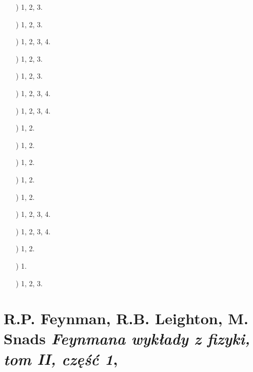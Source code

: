 \documentclass[a4paper,11pt]{article}
\numberwithin{equation}{section}
\begin{document}
\begin{itemize}

\item[\romannumeral3)] 1, 2, 3.

\item[\romannumeral4)] 1, 2, 3.

\item[\romannumeral5)] 1, 2, 3, 4.

\item[\romannumeral6)] 1, 2, 3.

\item[\romannumeral7)] 1, 2, 3.

\item[\romannumeral8)] 1, 2, 3, 4.

\item[\romannumeral9)] 1, 2, 3, 4.

\item[\romannumeral10)] 1, 2.

\item[\romannumeral11)] 1, 2.

\item[\romannumeral12)] 1, 2.

\item[\romannumeral13)] 1, 2.

\item[\romannumeral14)] 1, 2.

\item[\romannumeral16)] 1, 2, 3, 4.

\item[\romannumeral17)] 1, 2, 3, 4.

\item[\romannumeral18)] 1, 2.

\item[\romannumeral19)] 1.

\item[\romannumeral20)] 1, 2, 3.

\end{itemize}










\section{R.P. Feynman, R.B. Leighton, M. Snads
  \textit{Feynmana wykłady z fizyki, tom II, część 1},
}
\end{document}
